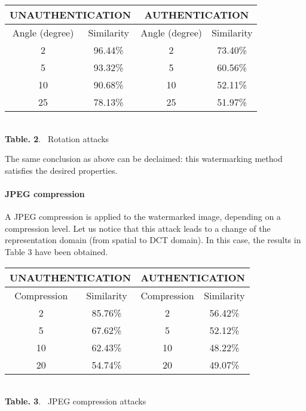 \documentclass[journal]{IEEEtran}
\begin{document}
\begin{center}
\begin{footnotesize}
\begin{tabular}{|c|c||c|c|}
\hline
\multicolumn{2}{|c||}{UNAUTHENTICATION}  & \multicolumn{2}{c|}{AUTHENTICATION}\\ 
\hline
Angle (degree) & Similarity & Angle (degree) & Similarity \\
 \hline
2 & 96.44\% & 2 & 73.40\% \\
5 & 93.32\% & 5 & 60.56\% \\
10 & 90.68\% & 10 & 52.11\% \\
25 & 78.13\% & 25 & 51.97\% \\
\hline
\end{tabular}
\end{footnotesize}\\
\vspace{0.5cm}
\textbf{Table. 2}. ~Rotation attacks

\end{center}




The same conclusion as above can be declaimed: this watermarking method
satisfies the desired properties.

\paragraph{JPEG compression}

A JPEG compression is applied to the watermarked image, depending on a
compression level. Let us notice that this attack leads to a change of
the representation domain (from spatial to DCT domain). In this case, the results in Table 3 have been obtained.

\begin{center}
\begin{footnotesize}
\begin{tabular}{|c|c||c|c|}
\hline
\multicolumn{2}{|c||}{UNAUTHENTICATION}  & \multicolumn{2}{c|}{AUTHENTICATION}\\ 
\hline
Compression & Similarity & Compression & Similarity \\
 \hline
2 & 85.76\% & 2 & 56.42\% \\
5 & 67.62\% & 5 & 52.12\% \\
10 & 62.43\% & 10 & 48.22\% \\
20 & 54.74\% & 20 & 49.07\% \\
\hline
\end{tabular}
\end{footnotesize}\\
\vspace{0.5cm}
\textbf{Table. 3}. ~JPEG compression attacks
\end{center}
\end{document}
